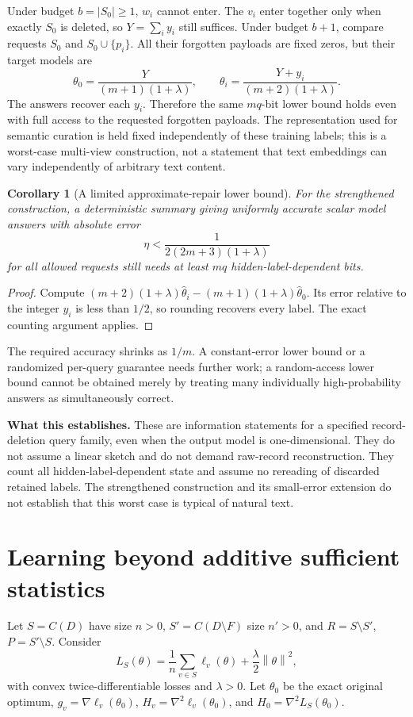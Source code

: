 \documentclass[11pt,a4paper]{article}
\newtheorem{corollary}[theorem]{Corollary}
\theoremstyle{definition}\newtheorem{definition}[theorem]{Definition}
\newcommand{\norm}[1]{\left\lVert #1\right\rVert}
\newcommand{\minus}{\setminus}
\begin{document}
Under budget $b=|S_0|\ge1$, $w_i$ cannot enter. The $v_i$ enter together only when exactly $S_0$ is deleted, so $Y=\sum_i y_i$ still suffices. Under budget $b+1$, compare requests $S_0$ and $S_0\cup\{p_i\}$. All their forgotten payloads are fixed zeros, but their target models are
\[
 \theta_0=\frac{Y}{(m+1)(1+\lambda)},\qquad
 \theta_i=\frac{Y+y_i}{(m+2)(1+\lambda)}.
\]
The answers recover each $y_i$. Therefore the same $mq$-bit lower bound holds even with full access to the requested forgotten payloads. The representation used for semantic curation is held fixed independently of these training labels; this is a worst-case multi-view construction, not a statement that text embeddings can vary independently of arbitrary text content.

\begin{corollary}[A limited approximate-repair lower bound]
For the strengthened construction, a deterministic summary giving uniformly accurate scalar model answers with absolute error
\[
 \eta<\frac{1}{2(2m+3)(1+\lambda)}
\]
for all allowed requests still needs at least $mq$ hidden-label-dependent bits.
\end{corollary}
\begin{proof}
Compute $(m+2)(1+\lambda)\widehat\theta_i-(m+1)(1+\lambda)\widehat\theta_0$. Its error relative to the integer $y_i$ is less than $1/2$, so rounding recovers every label. The exact counting argument applies.
\end{proof}
The required accuracy shrinks as $1/m$. A constant-error lower bound or a randomized per-query guarantee needs further work; a random-access lower bound cannot be obtained merely by treating many individually high-probability answers as simultaneously correct.

\textbf{What this establishes.} These are information statements for a specified record-deletion query family, even when the output model is one-dimensional. They do not assume a linear sketch and do not demand raw-record reconstruction. They count all hidden-label-dependent state and assume no rereading of discarded retained labels. The strengthened construction and its small-error extension do not establish that this worst case is typical of natural text.

\section{Learning beyond additive sufficient statistics}\label{sec:convex}
Let $S=C(D)$ have size $n>0$, $S'=C(D\minus F)$ size $n'>0$, and $R=S\minus S'$, $P=S'\minus S$. Consider
\[
 L_S(\theta)=\frac1n\sum_{v\in S}\ell_v(\theta)+\frac\lambda2\norm\theta^2,
\]
with convex twice-differentiable losses and $\lambda>0$. Let $\theta_0$ be the exact original optimum, $g_v=\nabla\ell_v(\theta_0)$, $H_v=\nabla^2\ell_v(\theta_0)$, and $H_0=\nabla^2L_S(\theta_0)$.
\end{document}
